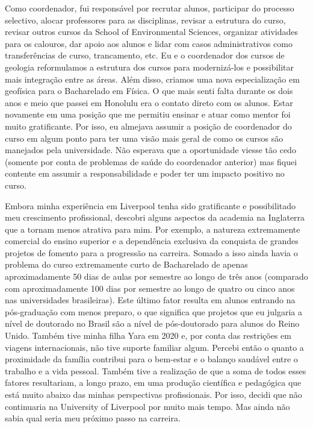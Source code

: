 \documentclass[12pt,a4paper,oneside]{book}
\newcommand{\UoL}{University of Liverpool}
\begin{document}
Como coordenador, fui responsável por recrutar alunos, participar do processo
selectivo, alocar professores para as disciplinas, revisar a estrutura do
curso, revisar outros cursos da School of Environmental Sciences, organizar
atividades para os calouros, dar apoio aos alunos e lidar com casos
administrativos como transferências de curso, trancamento, etc.
Eu e o coordenador dos cursos de geologia reformulamos a estrutura
dos cursos para modernizá-los e possibilitar mais integração entre as áreas.
Além disso, criamos uma nova especialização em geofísica para o Bacharelado em
Física.
O que mais senti falta durante os dois anos e meio que passei em Honolulu era
o contato direto com os alunos.
Estar novamente em uma posição que me permitiu ensinar e atuar como mentor foi
muito gratificante.
Por isso, eu almejava assumir a posição de coordenador do curso em algum ponto
para ter uma visão mais geral de como os cursos são manejados pela
universidade.
Não esperava que a oportunidade viesse tão cedo (somente por conta de problemas
de saúde do coordenador anterior) mas fiquei contente em assumir a
responsabilidade e poder ter um impacto positivo no curso.

Embora minha experiência em Liverpool tenha sido gratificante e possibilitado
meu crescimento profissional, descobri alguns aspectos da academia na
Inglaterra que a tornam menos atrativa para mim.
Por exemplo, a natureza extremamente comercial do ensino superior e
a dependência exclusiva da conquista de grandes projetos de fomento para
a progressão na carreira.
Somado a isso ainda havia o problema do curso extremamente curto de Bacharelado
de apenas aproximadamente 50 dias de aulas por semestre ao longo de três anos
(comparado com aproximadamente 100 dias por semestre ao longo de quatro ou
cinco anos nas universidades brasileiras).
Este último fator resulta em alunos entrando na pós-graduação com menos
preparo, o que significa que projetos que eu julgaria a nível de doutorado no
Brasil são a nível de pós-doutorado para alunos do Reino Unido.
Também tive minha filha Yara em 2020 e, por conta das restrições em viagens
internacionais, não tive suporte familiar algum.
Percebi então o quanto a proximidade da família contribui para o bem-estar
e o balanço saudável entre o trabalho e a vida pessoal.
Também tive a realização de que a soma de todos esses fatores resultariam,
a longo prazo, em uma produção científica e pedagógica que está muito abaixo
das minhas perspectivas profissionais.
Por isso, decidi que não continuaria na \UoL{} por muito mais tempo.
Mas ainda não sabia qual seria meu próximo passo na carreira.
\end{document}
